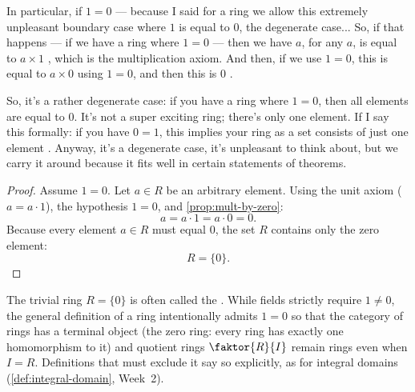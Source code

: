 \begin{speech}[00:11:32 - 00:12:43]
In particular, if $1 = 0$  --- because I said for a ring we allow this extremely unpleasant boundary case where $1$ is equal to $0$, the degenerate case... So, if that happens --- if we have a ring where $1 = 0$ --- then we have $a$, for any $a$, is equal to $a \times 1$ , which is the multiplication axiom. And then, if we use $1 = 0$, this is equal to $a \times 0$  using $1 = 0$, and then this is $0$ .

So, it's a rather degenerate case: if you have a ring where $1 = 0$, then all elements are equal to $0$. It's not a super exciting ring; there's only one element. If I say this formally: if you have $0 = 1$, this implies your ring as a set consists of just one element . Anyway, it's a degenerate case, it's unpleasant to think about, but we carry it around because it fits well in certain statements of theorems.
\end{speech}

\begin{content}

\begin{proof}
Assume $1 = 0$. Let $a \in R$ be an arbitrary element. Using the unit axiom ($a = a \cdot 1$), the hypothesis $1 = 0$, and \cref{prop:mult-by-zero}:
\[
a = a \cdot 1 = a \cdot 0 = 0.
\]
Because every element $a \in R$ must equal $0$, the set $R$ contains only the zero element:
\[
R = \{0\}.
\]
\end{proof}

\begin{remark}
The trivial ring $R = \{0\}$ is often called the . While fields strictly require $1 \neq 0$, the general definition of a ring intentionally admits $1 = 0$ so that the category of rings has a terminal object (the zero ring: every ring has exactly one homomorphism to it) and quotient rings $\faktor{R}{I}$ remain rings even when $I = R$. Definitions that must exclude it say so explicitly, as for integral domains (\cref{def:integral-domain}, Week~2).
\end{remark}
\end{content}

